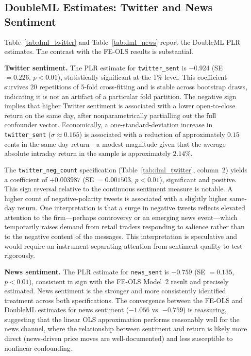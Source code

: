 \subsection{DoubleML Estimates: Twitter and News
Sentiment}\label{doubleml-estimates-twitter-and-news-sentiment}

Table~\ref{tab:dml_twitter} and
Table~\ref{tab:dml_news} report the
DoubleML PLR estimates. The contrast with the FE-OLS results is
substantial.

\textbf{Twitter sentiment.} The PLR estimate for \texttt{twitter\_sent}
is \(- 0.924\) (SE \(= 0.226\), \(p < 0.01\)), statistically significant
at the 1\% level. This coefficient survives 20 repetitions of 5-fold
cross-fitting and is stable across bootstrap draws, indicating it is not
an artifact of a particular fold partition. The negative sign implies
that higher Twitter sentiment is associated with a lower open-to-close
return on the same day, after nonparametrically partialling out the full
confounder vector. Economically, a one-standard-deviation increase in
\texttt{twitter\_sent} (\(\sigma \approx 0.165\)) is associated with a
reduction of approximately \(0.15\) cents in the same-day return---a
modest magnitude given that the average absolute intraday return in the
sample is approximately \(2.14\)\%.

The \texttt{twitter\_neg\_count} specification
(Table~\ref{tab:dml_twitter},
column~2) yields a coefficient of \(+ 0.003987\) (SE \(= 0.001503\),
\(p < 0.01\)), significant and positive. This sign reversal relative to
the continuous sentiment measure is notable. A higher count of
negative-polarity tweets is associated with a slightly higher same-day
return. One interpretation is that a surge in negative tweets reflects
elevated attention to the firm---perhaps controversy or an emerging news
event---which temporarily raises demand from retail traders responding
to salience rather than to the negative content of the messages. This
interpretation is speculative and would require an instrument separating
attention from sentiment quality to test rigorously.

\textbf{News sentiment.} The PLR estimate for \texttt{news\_sent} is
\(- 0.759\) (SE \(= 0.135\), \(p < 0.01\)), consistent in sign with the
FE-OLS Model~2 result and precisely estimated. News sentiment is the
stronger and more consistently identified treatment across both
specifications. The convergence between the FE-OLS and DoubleML
estimates for news sentiment (\(- 1.056\) vs. \(- 0.759\)) is
reassuring, suggesting that the linear OLS approximation performs
reasonably well for the news channel, where the relationship between
sentiment and return is likely more direct (news-driven price moves are
well-documented) and less susceptible to nonlinear confounding.

